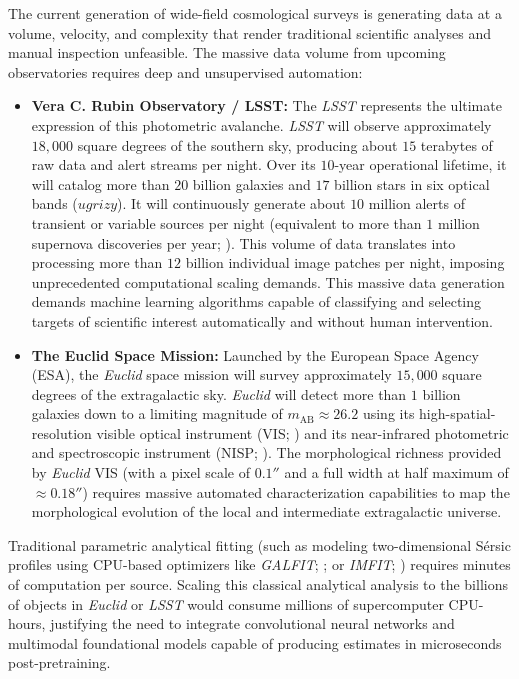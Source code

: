 The current generation of wide-field cosmological surveys is generating data at a volume, velocity, and complexity that render traditional scientific analyses and manual inspection unfeasible. The massive data volume from upcoming observatories requires deep and unsupervised automation:

\begin{itemize}
  \item \textbf{Vera C. Rubin Observatory / LSST:} The \textit{\gls{LSST}} \autocite{ar:ivezic-2019} represents the ultimate expression of this photometric avalanche. \textit{\gls{LSST}} will observe approximately $18,000$ square degrees of the southern sky, producing about $15$ terabytes of raw data and alert streams per night. Over its $10$-year operational lifetime, it will catalog more than $20$ billion galaxies and $17$ billion stars in six optical bands ($ugrizy$). It will continuously generate about $10$ million alerts of transient or variable sources per night (equivalent to more than $1$ million supernova discoveries per year; \cite{ar:hambleton-2023}). This volume of data translates into processing more than $12$ billion individual image patches per night, imposing unprecedented computational scaling demands. This massive data generation demands machine learning algorithms capable of classifying and selecting targets of scientific interest automatically and without human intervention.
  
  \item \textbf{The Euclid Space Mission:} Launched by the European Space Agency (ESA), the \textit{Euclid} space mission \autocite{ar:mellier-2024} will survey approximately $15,000$ square degrees of the extragalactic sky. \textit{Euclid} will detect more than $1$ billion galaxies down to a limiting magnitude of $m_{\text{AB}} \approx 26.2$ using its high-spatial-resolution visible optical instrument (VIS; \cite{ar:cropper-2024}) and its near-infrared photometric and spectroscopic instrument (NISP; \cite{ar:jahnke-2025}). The morphological richness provided by \textit{Euclid} VIS (with a pixel scale of $0.1''$ and a full width at half maximum of $\approx 0.18''$) requires massive automated characterization capabilities to map the morphological evolution of the local and intermediate extragalactic universe.
\end{itemize}

Traditional parametric analytical fitting (such as modeling two-dimensional Sérsic profiles using CPU-based optimizers like \textit{GALFIT}; \cite{ar:peng-2002,ar:peng-2010}; or \textit{IMFIT}; \cite{ar:erwin-2015}) requires minutes of computation per source. Scaling this classical analytical analysis to the billions of objects in \textit{Euclid} or \textit{LSST} would consume millions of supercomputer CPU-hours, justifying the need to integrate convolutional neural networks and multimodal foundational models capable of producing estimates in microseconds post-pretraining.

